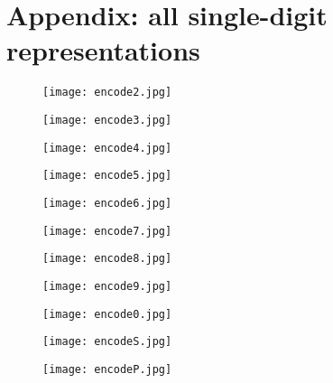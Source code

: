 \documentclass{article}
\begin{document}
\section{Appendix: all single-digit representations}

\begin{figure}[h]
	\texttt{[image: encode2.jpg]}
	\caption{}

	\label{encode2}
\end{figure}

\begin{figure}[h]
	\texttt{[image: encode3.jpg]}
	\caption{}

	\label{encode3}
\end{figure}

\begin{figure}[h]
	\texttt{[image: encode4.jpg]}
	\caption{}

	\label{encode4}
\end{figure}

\begin{figure}[h]
	\texttt{[image: encode5.jpg]}
	\caption{}

	\label{encode5}
\end{figure}

\begin{figure}[h]
	\texttt{[image: encode6.jpg]}
	\caption{}

	\label{encode6}
\end{figure}

\begin{figure}[h]
	\texttt{[image: encode7.jpg]}
	\caption{}

	\label{encode7}
\end{figure}

\begin{figure}[h]
	\texttt{[image: encode8.jpg]}
	\caption{}
	\label{encode8}
\end{figure}

\begin{figure}[h]
	\texttt{[image: encode9.jpg]}
	\caption{}
	\label{encode9}
\end{figure}

\begin{figure}[h]
	\texttt{[image: encode0.jpg]}
	\caption{}
	\label{encode0}
\end{figure}

\begin{figure}[h]
	\texttt{[image: encodeS.jpg]}
	\label{encodeS}
\end{figure}

\begin{figure}[h]
	\texttt{[image: encodeP.jpg]}
	\caption{}
	\label{encodeP}
\end{figure}
\end{document}
